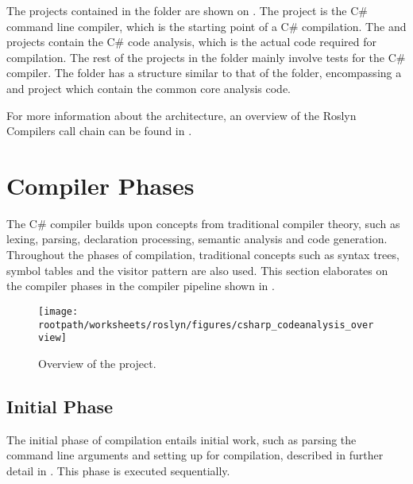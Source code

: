 The projects contained in the  folder are shown on . The  project is the C\# command line compiler, which is the starting point of a C\# compilation. The  and  projects contain the C\# code analysis, which is the actual code required for compilation. The rest of the projects in the  folder mainly involve tests for the C\# compiler. The  folder has a structure similar to that of the  folder, encompassing a   and  project which contain the common core analysis code.

For more information about the architecture, an overview of the Roslyn Compilers call chain can be found in .

\section{Compiler Phases}\label{sec:compile_phases}
The C\# compiler builds upon concepts from traditional compiler theory, such as lexing, parsing, declaration processing, semantic analysis and code generation\cite{sebestaProLang}\cite{fischer2009crafting}. Throughout the phases of compilation, traditional concepts such as syntax trees, symbol tables and the visitor pattern\cite[p. 366]{gamma1994design} are also used. This section elaborates on the compiler phases in the compiler pipeline shown in .

\begin{figure}[htbp]
\centering
\texttt{[image: \\rootpath/worksheets/roslyn/figures/csharp\_codeanalysis\_overview]}
\caption{Overview of the  project.}
\label{fig:roslyn_csharpanalysis_overview}
\end{figure}

\subsection{Initial Phase}
The initial phase of compilation entails initial work, such as parsing the command line arguments and setting up for compilation, described in further detail in . This phase is executed sequentially\cite{sadovRoslynPerf}.

